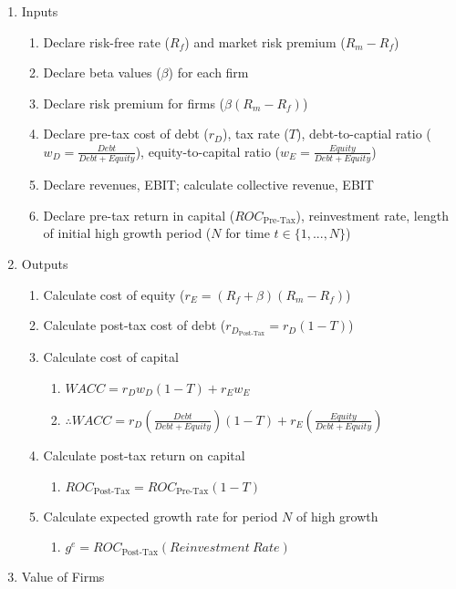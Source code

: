 \documentclass[11pt, english]{article}
\begin{document}
	\begin{enumerate}
	\setlength\itemsep{0cm}
		\item Inputs
		\begin{enumerate}
			\item Declare risk-free rate ($R_f$) and market risk premium ($R_m-R_f$)
			\item Declare beta values ($\beta$) for each firm
			\item Declare risk premium for firms ($\beta(R_m-R_f)$)
			\item Declare pre-tax cost of debt ($r_D$), tax rate ($T$), debt-to-captial ratio ($w_D=\frac{Debt}{Debt+Equity}$), equity-to-capital ratio ($w_E=\frac{Equity}{Debt+Equity}$)
			\item Declare revenues, EBIT; calculate collective revenue, EBIT
			\item Declare pre-tax return in capital ($ROC_{\textrm{Pre-Tax}}$), reinvestment rate, length of initial high growth period ($N$ for time $t\in\{1,...,N\}$)
		\end{enumerate}
		\item Outputs
		\begin{enumerate}
			\item Calculate cost of equity ($r_E=(R_f+\beta)(R_m-R_f)$)
			\item Calculate post-tax cost of debt ($r_{D_{\textrm{Post-Tax}}}=r_D(1-T)$)
			\item Calculate cost of capital
			\begin{enumerate}
				\item $WACC=r_Dw_D(1-T)+r_Ew_E$
				\item $\therefore WACC=r_D\left(\frac{Debt}{Debt+Equity}\right)(1-T)+r_E\left(\frac{Equity}{Debt+Equity}\right)$
			\end{enumerate}
			\item Calculate post-tax return on capital
			\begin{enumerate}
				\item $ROC_{\textrm{Post-Tax}}=ROC_{\textrm{Pre-Tax}}(1-T)$
			\end{enumerate}
			\item Calculate expected growth rate for period $N$ of high growth
			\begin{enumerate}
				\item $g^e=ROC_{\textrm{Post-Tax}}(Reinvestment\ Rate)$
			\end{enumerate}
		\end{enumerate}
		\item Value of Firms

\end{enumerate}
\end{document}
